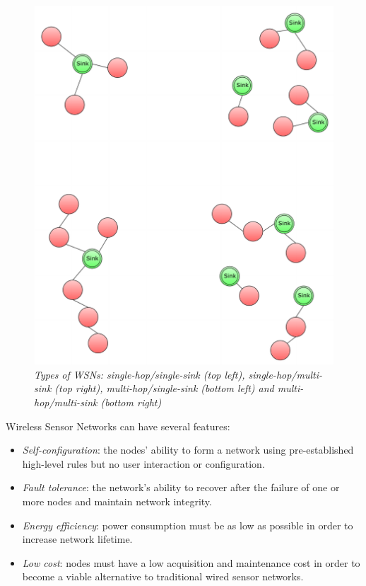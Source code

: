 \begin{figure}[ht]
	\begin{center}
		\includegraphics[scale=0.8]{img/types_of_wsn.pdf}
	\end{center}
	\caption{\small \itshape{Types of WSNs: single-hop/single-sink
	(top left), single-hop/multi-sink (top right), multi-hop/single-sink
	(bottom left) and multi-hop/multi-sink (bottom right)}}
\end{figure}

Wireless Sensor Networks can have several features:
\begin{itemize}
	\item \emph{Self-configuration}: the nodes' ability to form a network
		using pre-established high-level rules but no user interaction
		or configuration\cite{prehofer2005self}.
	\item \emph{Fault tolerance}: the network's ability to recover after
		the failure of one or more nodes and maintain network
		integrity\cite{koushanfar2002fault}.
	\item \emph{Energy efficiency}: power consumption must be as low as
		possible in order to increase network lifetime.
	\item \emph{Low cost}: nodes must have a low acquisition and
		maintenance cost in order to become a viable alternative to
		traditional wired sensor networks.
\end{itemize}

